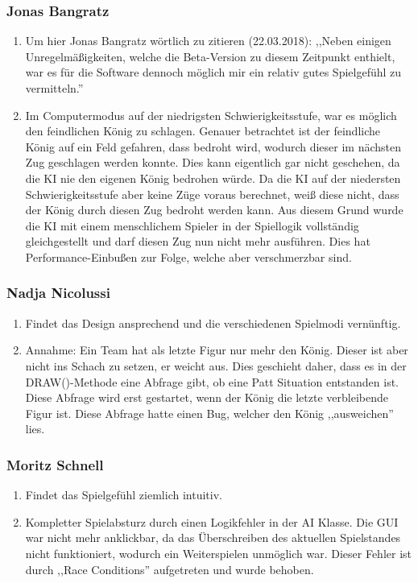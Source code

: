 \documentclass[12pt,a4paper]{article}
\begin{document}
\subsubsection*{Jonas Bangratz}
\begin{enumerate}[I]
	\item{Um hier Jonas Bangratz wörtlich zu zitieren (22.03.2018): ,,Neben einigen Unregelmäßigkeiten, welche die Beta-Version zu diesem Zeitpunkt enthielt, war es für die Software dennoch möglich mir ein relativ gutes Spielgefühl zu vermitteln.''}
	\item{Im Computermodus auf der niedrigsten Schwierigkeitsstufe, war es möglich den feindlichen König zu schlagen. Genauer betrachtet ist der feindliche König auf ein Feld gefahren, dass bedroht wird, wodurch dieser im nächsten Zug geschlagen werden konnte. Dies kann eigentlich gar nicht geschehen, da die KI nie den eigenen König bedrohen würde. Da die KI auf der niedersten Schwierigkeitsstufe aber keine Züge voraus berechnet, weiß diese nicht, dass der König durch diesen Zug bedroht werden kann. Aus diesem Grund wurde die KI mit einem menschlichem Spieler in der Spiellogik vollständig gleichgestellt und darf diesen Zug nun nicht mehr ausführen. Dies hat Performance-Einbußen zur Folge, welche aber verschmerzbar sind. }
\end{enumerate}

\subsubsection*{Nadja Nicolussi}
\begin{enumerate}[I]
	\item{Findet das Design ansprechend und die verschiedenen Spielmodi vernünftig.}
	\item{Annahme: Ein Team hat als letzte Figur nur mehr den König. Dieser ist aber nicht ins Schach zu setzen, er weicht aus. Dies geschieht daher, dass es in der DRAW()-Methode eine Abfrage gibt, ob eine Patt Situation entstanden ist. Diese Abfrage wird erst gestartet, wenn der König die letzte verbleibende Figur ist. Diese Abfrage hatte einen Bug, welcher den König ,,ausweichen'' lies.}
\end{enumerate}

\subsubsection*{Moritz Schnell}
\begin{enumerate}[I]
	\item{Findet das Spielgefühl ziemlich intuitiv.}
	\item{Kompletter Spielabsturz durch einen Logikfehler in der AI Klasse. Die GUI war nicht mehr anklickbar, da das Überschreiben des aktuellen Spielstandes nicht funktioniert, wodurch ein Weiterspielen unmöglich war. Dieser Fehler ist durch ,,Race Conditions'' aufgetreten und wurde behoben.}
\end{enumerate}
\end{document}
